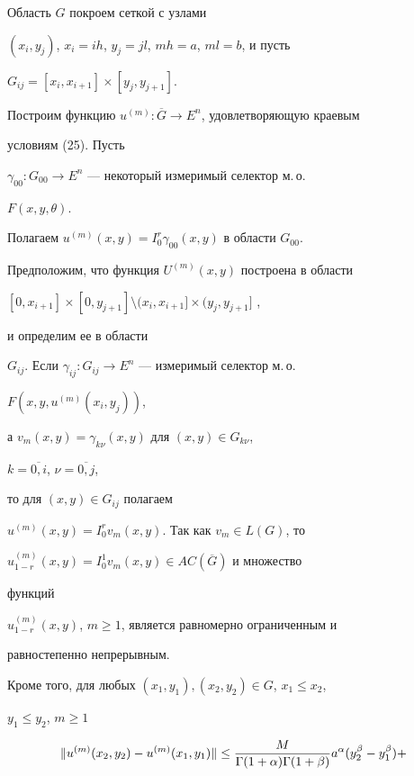  


\begin{pf} Область $G$ покроем сеткой с узлами 


$(x_i,y_j)$, $x_i=ih$, $y_j=jl$, $mh=a$, $ml=b$, и пусть 


$G_{ij}=[x_i,x_{i+1}]\times[y_j,y_{j+1}]$. 


Построим функцию $u^{(m)}:\overline G\to E^n$, удовлетворяющую краевым 


условиям (25). Пусть 


$\gamma_{00}:G_{00}\to E^n$ --- некоторый измеримый селектор м.\,о. 


$F(x,y,\theta)$. 


Полагаем $u^{(m)}(x,y)=I_0^r\gamma_{00}(x,y)$ в области $G_{00}$. 


Предположим, что функция $U^{(m)}(x,y)$ построена в области 


$[0,x_{i+1}]\times[0,y_{j+1}]\setminus(x_i,x_{i+1}]\times(y_j,y_{j+1}]$ ,


и определим ее в области 


$G_{ij}$. Если $\gamma_{ij}:G_{ij}\to E^n$ --- измеримый селектор м.\,о. 


$F(x,y,u^{(m)}(x_i,y_j))$, 


а $v_m(x,y)=\gamma_{k\nu}(x,y)$ для $(x,y)\in G_{k\nu}$, 


$k=\overline{0,i}$, $\nu=\overline{0,j}$, 


то для $(x,y)\in G_{ij}$ полагаем 


$u^{(m)}(x,y)=I_0^rv_m(x,y)$. Так как $v_m\in L(G)$, то 


$u^{(m)}_{1-r}(x,y)=I_0^1v_m(x,y)\in AC(\overline G)$ и множество 


функций 


$u^{(m)}_{1-r}(x,y)$, $m\ge 1$, является равномерно ограниченным и 


равностепенно непрерывным. 


 


Кроме того, для любых $(x_1,y_1),(x_2,y_2)\in G$, $x_1\le x_2$, 


$y_1\le y_2$, $m\ge 1$ 


\begin{gather} 


\|u^{(m)}(x_2,y_2)-u^{(m)}(x_1,y_1)\|\le 


\frac{M} 


{\Gamma(1+\alpha)\Gamma(1+\beta)}a^\alpha(y_2^\beta-y_1^\beta)+\notag \\



\end{gather}
\end{pf}

